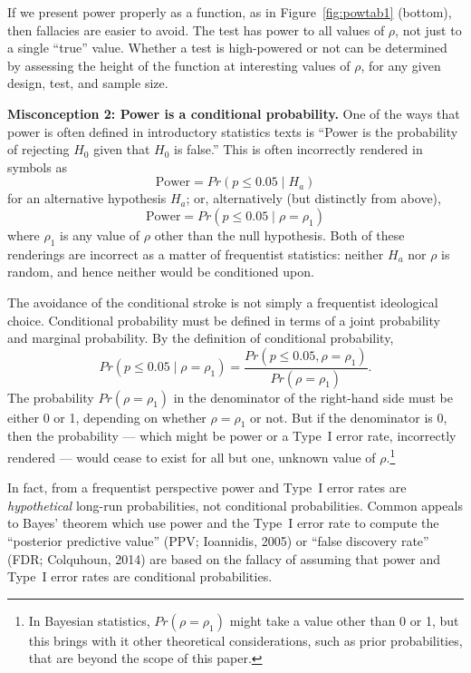 \documentclass[doc,a4paper,floatsintext,draftfirst]{apa6}
\begin{document}
If we present power properly as a function, as in Figure~\ref{fig:powtab1} (bottom), then fallacies are easier to avoid. The test has power to all values of $\rho$, not just to a single ``true'' value. Whether a test is high-powered or not can be determined by assessing the height of the function at interesting values of $\rho$, for any given design, test, and sample size.

{\bf Misconception 2: Power is a conditional probability.}
One of the ways that power is often defined in introductory statistics texts is ``Power is the probability of rejecting $H_0$ given that $H_0$ is false.'' This is often incorrectly rendered in symbols as
\[
\mbox{Power} = Pr(p\leq 0.05\mid H_a)
\]
for an alternative hypothesis $H_a$; or, alternatively (but distinctly from above),
\[
\mbox{Power} = Pr(p\leq 0.05\mid \rho=\rho_1)
\]
where $\rho_1$ is any value of $\rho$ other than the null hypothesis. Both of these renderings are incorrect as a matter of frequentist statistics: neither $H_a$ nor $\rho$ is random, and hence neither would be conditioned upon.

The avoidance of the conditional stroke is not simply a frequentist ideological choice. Conditional probability must be defined in terms of a joint probability and marginal probability. By the definition of conditional probability,
\[
Pr(p\leq 0.05\mid \rho=\rho_1) = \frac{Pr(p\leq 0.05,\rho=\rho_1) }{Pr(\rho=\rho_1)}.
\]
The probability $Pr(\rho=\rho_1)$ in the denominator of the right-hand side must be either 0 or 1, depending on whether $\rho=\rho_1$ or not. But if the denominator is 0, then the probability --- which might be power or a Type~I error rate, incorrectly rendered --- would cease to exist for all but one, unknown value of $\rho$.\footnote{In Bayesian statistics, $Pr(\rho=\rho_1)$ might take a value other than 0 or 1, but this brings with it other theoretical considerations, such as prior probabilities, that are beyond the scope of this paper.}

In fact, from a frequentist perspective power and Type~I error rates are {\em hypothetical} long-run probabilities, not conditional probabilities. Common appeals to Bayes' theorem which use power and the Type~I error rate to compute the ``posterior predictive value'' (PPV; Ioannidis, 2005) or ``false discovery rate'' (FDR; Colquhoun, 2014) are based on the fallacy of assuming that power and Type~I error rates are conditional probabilities.

\nocite{Ioannidis:2005,Colquhoun:2014}
\end{document}
